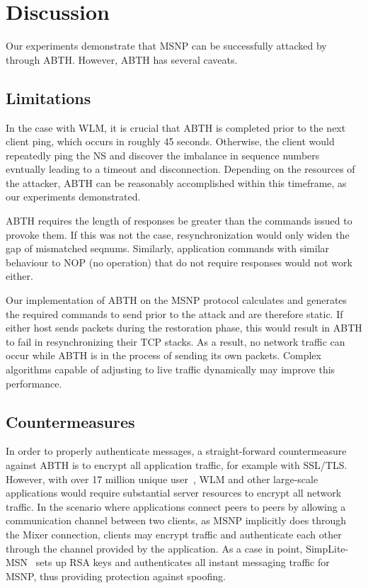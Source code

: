 \documentclass{sig-alternate}
\begin{document}
\section{Discussion}
\label{sec:discussion}

Our experiments demonstrate that MSNP can be successfully attacked by through ABTH.
However, ABTH has several caveats.

\subsection{Limitations}

In the case with WLM, it is crucial that ABTH is completed prior to the next client ping, which occurs in roughly 45 seconds.
Otherwise, the client would repeatedly ping the NS and discover the imbalance in sequence numbers evntually leading to a timeout and disconnection.
Depending on the resources of the attacker, ABTH can be reasonably accomplished within this timeframe, as our experiments demonstrated.

ABTH requires the length of responses be greater than the commands issued to provoke them.
If this was not the case, resynchronization would only widen the gap of mismatched seqnums.
Similarly, application commands with similar behaviour to NOP (no operation) that do not require responses would not work either.

Our implementation of ABTH on the MSNP protocol calculates and generates the required commands to send prior to the attack and are therefore static.
If either host sends packets during the restoration phase, this would result in ABTH to fail in resynchronizing their TCP stacks.
As a result, no network traffic can occur while ABTH is in the process of sending its own packets.
Complex algorithms capable of adjusting to live traffic dynamically may improve this performance.

\subsection{Countermeasures}

In order to properly authenticate messages, a straight-forward countermeasure against ABTH is to encrypt all application traffic, for example with SSL/TLS.
However, with over 17 million unique user~\cite{templeton:spoof}, WLM and other large-scale applications would require substantial server resources to encrypt all network traffic.
In the scenario where applications connect peers to peers by allowing a communication channel between two clients, as MSNP implicitly does through the Mixer connection, clients may encrypt traffic and authenticate each other through the channel provided by the application.
As a case in point, SimpLite-MSN~\cite{secway:url} sets up RSA keys and authenticates all instant messaging traffic for MSNP, thus providing protection against spoofing.
\end{document}
